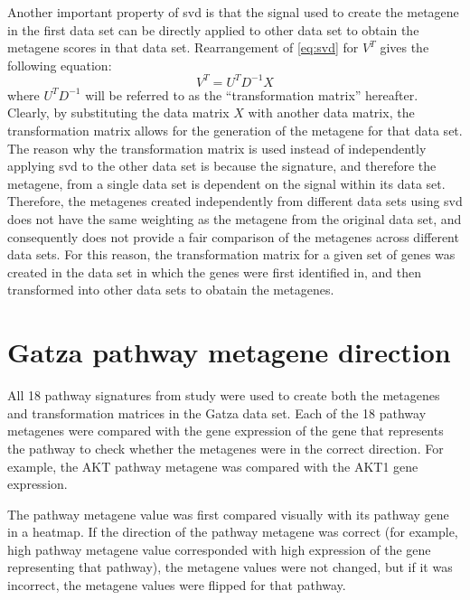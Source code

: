 Another important property of \gls{svd} is that the signal used to create the metagene in the first data set can be directly applied to other data set to obtain the metagene scores in that data set.
Rearrangement of \cref{eq:svd} for $V^T$ gives the following equation:
\begin{equation}
	\label{eq:transmat}
	V^T = U^{T}D^{-1}X
\end{equation}
where $U^{T}D^{-1}$ will be referred to as the ``transformation matrix'' hereafter.
Clearly, by substituting the data matrix $X$ with another data matrix, the transformation matrix allows for the generation of the metagene for that data set.
The reason why the transformation matrix is used instead of independently applying \gls{svd} to the other data set is because the signature, and therefore the metagene, from a single data set is dependent on the signal within its data set.
Therefore, the metagenes created independently from different data sets using \gls{svd} does not have the same weighting as the metagene from the original data set, and consequently does not provide a fair comparison of the metagenes across different data sets.
For this reason, the transformation matrix for a given set of genes was created in the data set in which the genes were first identified in, and then transformed into other data sets to obatain the metagenes.

\section{Gatza pathway metagene direction}
\label{sec:pathway_metagene_direction}

All 18 pathway signatures from \citet{Gatza2010a} study were used to create both the metagenes and transformation matrices in the Gatza data set.
Each of the 18 pathway metagenes were compared with the gene expression of the gene that represents the pathway to check whether the metagenes were in the correct direction.
For example, the AKT pathway metagene was compared with the AKT1 gene expression.

The pathway metagene value was first compared visually with its pathway gene in a heatmap.
If the direction of the pathway metagene was correct (for example, high pathway metagene value corresponded with high expression of the gene representing that pathway), the metagene values were not changed, but if it was incorrect, the metagene values were flipped for that pathway.

